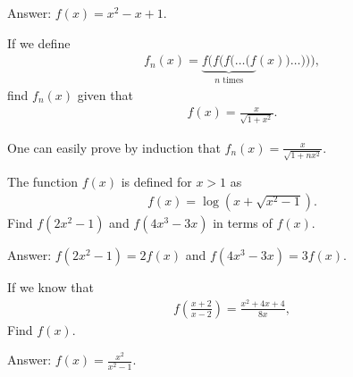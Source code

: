\begin{solution}[name=Solution by Parviz Shahriari]
Answer: $f(x)=x^2-x+1$.
\end{solution}

\begin{tcolorbox}
\begin{question}
If we define
\begin{align*}
    f_n(x)= \underbrace{f(f(f(\dots(f}_{n \text{ times}}(x))\dots))),
\end{align*}
find $f_n(x)$ given that
\begin{align*}
    f(x)=\frac{x}{\sqrt{1+x^2}}.
\end{align*}
\end{question}
\end{tcolorbox}

\begin{solution}[name=Solution by Parviz Shahriari]
One can easily prove by induction that $f_n(x)=\frac{x}{\sqrt{1+nx^2}}$.
\end{solution}


\begin{tcolorbox}
\begin{question}
The function $f(x)$ is defined for $x>1$ as
\begin{align*}
    f(x) = \log(x+\sqrt{x^2-1}).
\end{align*}
Find $f(2x^2-1)$ and $f(4x^3-3x)$ in terms of $f(x)$.
\end{question}
\end{tcolorbox}

\begin{solution}[name=Solution by Parviz Shahriari]
Answer: $f(2x^2-1)=2f(x)$ and $f(4x^3-3x)=3f(x)$.
\end{solution}


\begin{tcolorbox}
\begin{question}
If we know that
\begin{align*}
    f\left(\frac{x+2}{x-2}\right) = \frac{x^2+4x+4}{8x},
\end{align*}
Find $f(x)$.
\end{question}
\end{tcolorbox}

\begin{solution}[name=Solution by Parviz Shahriari]
Answer: $f(x) = \frac{x^2}{x^2-1}$.
\end{solution}


